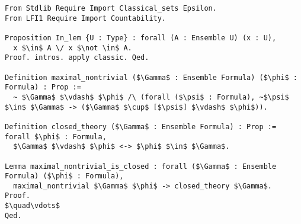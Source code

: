         \begin{lstlisting}[name=LFI, frame=single, language=coq]
From Stdlib Require Import Classical_sets Epsilon.
From LFI1 Require Import Countability.

Proposition In_lem {U : Type} : forall (A : Ensemble U) (x : U),
  x $\in$ A \/ x $\not \in$ A.
Proof. intros. apply classic. Qed.

Definition maximal_nontrivial ($\Gamma$ : Ensemble Formula) ($\phi$ : Formula) : Prop :=
  ~ $\Gamma$ $\vdash$ $\phi$ /\ (forall ($\psi$ : Formula), ~$\psi$ $\in$ $\Gamma$ -> ($\Gamma$ $\cup$ [$\psi$] $\vdash$ $\phi$)).

Definition closed_theory ($\Gamma$ : Ensemble Formula) : Prop := forall $\phi$ : Formula, 
  $\Gamma$ $\vdash$ $\phi$ <-> $\phi$ $\in$ $\Gamma$.

Lemma maximal_nontrivial_is_closed : forall ($\Gamma$ : Ensemble Formula) ($\phi$ : Formula),
  maximal_nontrivial $\Gamma$ $\phi$ -> closed_theory $\Gamma$.
Proof.
$\quad\vdots$
Qed.
        \end{lstlisting}

    
    